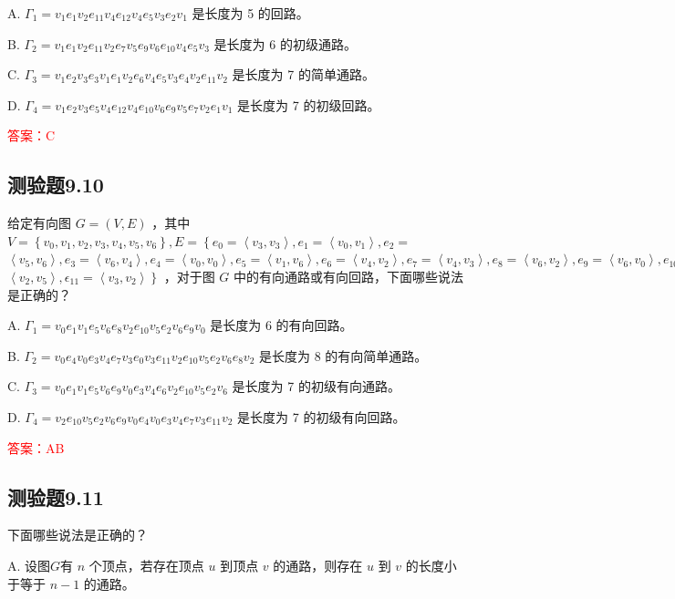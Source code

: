 \documentclass[UTF8, heading=true]{ctexart}
\begin{document}
A. $\Gamma_1=v_1 e_1 v_2 e_{11} v_4 e_{12} v_4 e_5 v_3 e_2 v_1$ 是长度为 5 的回路。

B. $\Gamma_2=v_1 e_1 v_2 e_{11} v_2 e_7 v_5 e_9 v_6 e_{10} v_4 e_5 v_3$ 是长度为 6 的初级通路。

C. $\Gamma_3=v_1 e_2 v_3 e_3 v_1 e_1 v_2 e_6 v_4 e_5 v_3 e_4 v_2 e_{11} v_2$ 是长度为 7 的简单通路。

D. $\Gamma_4=v_1 e_2 v_3 e_5 v_4 e_{12} v_4 e_{10} v_6 e_9 v_5 e_7 v_2 e_1 v_1$ 是长度为 7 的初级回路。

\textcolor{red}{答案：C}

\subsection{测验题9.10}

给定有向图 $G=(V, E)$ ，其中 $V=\left\{v_0, v_1, v_2, v_3, v_4, v_5, v_6\right\}, E=\left\{e_0=\left\langle v_3, v_3\right\rangle, e_1=\left\langle v_0, v_1\right\rangle, e_2=\right.$ $\left\langle v_5, v_6\right\rangle, e_3=\left\langle v_6, v_4\right\rangle, e_4=\left\langle v_0, v_0\right\rangle, e_5=\left\langle v_1, v_6\right\rangle, e_6=\left\langle v_4, v_2\right\rangle, e_7=\left\langle v_4, v_3\right\rangle, e_8=\left\langle v_6, v_2\right\rangle, e_9=\left\langle v_6, v_0\right\rangle, e_{10}=$ $\left.\left\langle v_2, v_5\right\rangle, \epsilon_{11}=\left\langle v_3, v_2\right\rangle\right\}$ ，对于图 $G$ 中的有向通路或有向回路，下面哪些说法是正确的？

A. $\Gamma_1=v_0 e_1 v_1 e_5 v_6 e_8 v_2 e_{10} v_5 e_2 v_6 e_9 v_0$ 是长度为 6 的有向回路。

B. $\Gamma_2=v_0 e_4 v_0 e_3 v_4 e_7 v_3 e_0 v_3 e_{11} v_2 e_{10} v_5 e_2 v_6 e_8 v_2$ 是长度为 8 的有向简单通路。

C. $\Gamma_3=v_0 e_1 v_1 e_5 v_6 e_9 v_0 e_3 v_4 e_6 v_2 e_{10} v_5 e_2 v_6$ 是长度为 7 的初级有向通路。

D. $\Gamma_4=v_2 e_{10} v_5 e_2 v_6 e_9 v_0 e_4 v_0 e_3 v_4 e_7 v_3 e_{11} v_2$ 是长度为 7 的初级有向回路。

\textcolor{red}{答案：AB}

\subsection{测验题9.11}

下面哪些说法是正确的？

A. 设图$G$有 $n$ 个顶点，若存在顶点 $u$ 到顶点 $v$ 的通路，则存在 $u$ 到 $v$ 的长度小于等于 $n-1$ 的通路。
\end{document}
